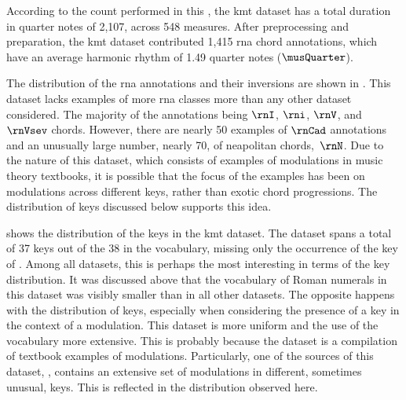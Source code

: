 
According to the count performed in this \thesisdiss{}, the
\gls{kmt} dataset has a total duration in quarter notes of
2,107, across 548 measures. After preprocessing and
preparation, the \gls{kmt} dataset contributed 1,415
\gls{rna} chord annotations, which have an average harmonic
rhythm of 1.49 quarter notes ($\musQuarter$).

The distribution of the \gls{rna} annotations and their
inversions are shown in . This
dataset lacks examples of more \gls{rna} classes more than
any other dataset considered. The majority of the
annotations being $\rnI$, $\rni$, $\rnV$, and $\rnVsev$
chords. However, there are nearly 50 examples of $\rnCad$
annotations and an unusually large number, nearly 70, of
\gls{neapolitan} chords,~$\rnN$. Due to the nature of this
dataset, which consists of examples of modulations in music
theory textbooks, it is possible that the focus of the
examples has been on modulations across different keys,
rather than exotic chord progressions. The distribution of
keys discussed below supports this idea.



 shows the distribution of the keys
in the \gls{kmt} dataset. The dataset spans a total of 37
keys out of the 38 in the vocabulary, missing only the
occurrence of the key of \keyBbb{}. Among all datasets, this
is perhaps the most interesting in terms of the key
distribution. It was discussed above that the vocabulary of
Roman numerals in this dataset was visibly smaller than in
all other datasets. The opposite happens with the
distribution of keys, especially when considering the
presence of a key in the context of a modulation. This
dataset is more uniform and the use of the vocabulary more
extensive. This is probably because the dataset is a
compilation of textbook examples of modulations.
Particularly, one of the sources of this dataset,
\textcite{reger1904supplement}, contains an extensive set of
modulations in different, sometimes unusual, keys. This is
reflected in the distribution observed here.
